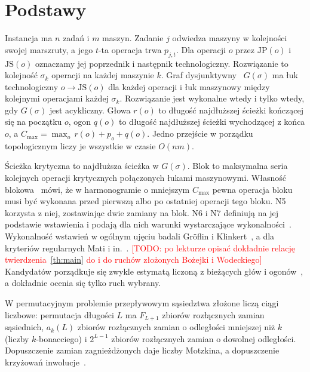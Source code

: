 \documentclass[10pt,twocolumn]{article}
\newcommand{\todo}[1]{\textcolor{red}{[TODO: #1]}}
\newcommand{\JP}{\mathrm{JP}}
\newcommand{\JS}{\mathrm{JS}}
\newcommand{\Cmax}{C_{\max}}
\begin{document}
\section{Podstawy}

Instancja ma $n$ zadań i $m$ maszyn. Zadanie $j$ odwiedza maszyny
w kolejności swojej marszruty, a jego $t$-ta operacja trwa $p_{j,t}$. Dla
operacji $o$ przez $\JP(o)$ i $\JS(o)$ oznaczamy jej poprzednik
i następnik technologiczny. Rozwiązanie to kolejność $\sigma_k$ operacji
na każdej maszynie $k$. Graf dysjunktywny~\cite{roy1964} $G(\sigma)$ ma
łuk technologiczny $o\to\JS(o)$ dla każdej operacji i łuk maszynowy
między kolejnymi operacjami każdej $\sigma_k$. Rozwiązanie jest wykonalne
wtedy i tylko wtedy, gdy $G(\sigma)$ jest acykliczny. Głowa $r(o)$ to
długość najdłuższej ścieżki kończącej się na początku $o$, ogon $q(o)$ to
długość najdłuższej ścieżki wychodzącej z końca $o$,
a $\Cmax=\max_o\, r(o)+p_o+q(o)$. Jedno przejście w porządku
topologicznym liczy je wszystkie w czasie $O(nm)$.

Ścieżka krytyczna to najdłuższa ścieżka w $G(\sigma)$. Blok to maksymalna
seria kolejnych operacji krytycznych połączonych łukami maszynowymi.
Własność blokowa~\cite{brucker1994,nowicki1996} mówi, że w harmonogramie
o mniejszym $\Cmax$ pewna operacja bloku musi być wykonana przed pierwszą
albo po ostatniej operacji tego bloku. N5 korzysta z niej, zostawiając
dwie zamiany na blok. N6 i N7 definiują na jej podstawie wstawienia
i podają dla nich warunki wystarczające
wykonalności~\cite{balas1998,zhang2007}. Wykonalność wstawień w ogólnym
ujęciu badali Gr\"oflin i Klinkert~\cite{groflin2007}, a dla kryteriów
regularnych Mati i in.~\cite{mati2011}. \todo{po lekturze opisać
dokładnie relację twierdzenia~\ref{th:main} do
\cite{groflin2007,mati2011,dauzere1997} i do ruchów złożonych Bożejki
i Wodeckiego}
Kandydatów porządkuje się zwykle estymatą liczoną z bieżących głów
i ogonów~\cite{taillard1994,balas1998}, a dokładnie ocenia się tylko ruch
wybrany.

W permutacyjnym problemie przepływowym sąsiedztwa złożone liczą ciągi
liczbowe: permutacja długości $L$ ma $F_{L+1}$ zbiorów rozłącznych zamian
sąsiednich, $a_k(L)$ zbiorów rozłącznych zamian o odległości mniejszej niż
$k$ (liczby $k$-bonacciego) i $2^{L-1}$ zbiorów rozłącznych zamian
o dowolnej odległości. Dopuszczenie zamian zagnieżdżonych daje liczby
Motzkina, a dopuszczenie krzyżowań inwolucje~\cite{motzkin_own}.

\end{document}
